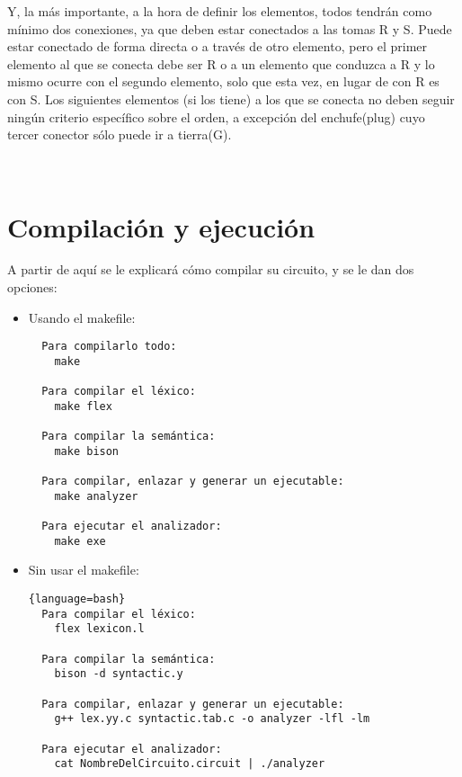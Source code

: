 \documentclass{article}
\begin{document}
Y, la más importante, a la hora de definir los elementos, todos tendrán como mínimo dos conexiones, ya que deben estar conectados a las tomas R y S. Puede estar conectado de forma directa o a través de otro elemento, pero el primer elemento al que se conecta debe ser R o a un elemento que conduzca a R y lo mismo ocurre con el segundo elemento, solo que esta vez, en lugar de con R es con S. Los siguientes elementos (si los tiene) a los que se conecta no deben seguir ningún criterio específico sobre el orden, a excepción del enchufe(plug) cuyo tercer conector sólo puede ir a tierra(G).

\

\section{Compilación y ejecución}

\lstset{style=bash}

A partir de aquí se le explicará cómo compilar su circuito, y se le dan dos opciones:
\begin{itemize}
\item Usando el makefile:
  \begin{lstlisting}
  Para compilarlo todo:
    make

  Para compilar el léxico:
    make flex

  Para compilar la semántica:
    make bison

  Para compilar, enlazar y generar un ejecutable:
    make analyzer

  Para ejecutar el analizador:
    make exe
\end{lstlisting}
\item Sin usar el makefile:
\begin{lstlisting}[basicstyle=\footnotesize]{language=bash}
  Para compilar el léxico:
    flex lexicon.l

  Para compilar la semántica:
    bison -d syntactic.y

  Para compilar, enlazar y generar un ejecutable:
    g++ lex.yy.c syntactic.tab.c -o analyzer -lfl -lm

  Para ejecutar el analizador:
    cat NombreDelCircuito.circuit | ./analyzer

\end{lstlisting}
\end{itemize}
\end{document}
